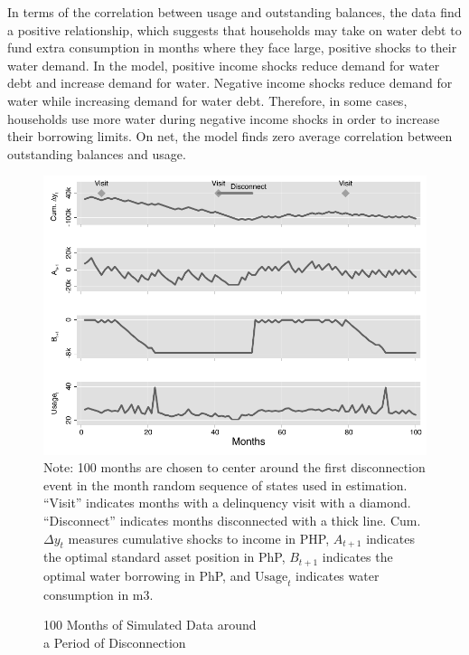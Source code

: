 \documentclass[12pt]{article}
\begin{document}
In terms of the correlation between usage and outstanding balances, the data find a positive relationship, which suggests that households may take on water debt to fund extra consumption in months where they face large, positive shocks to their water demand.  In the model, positive income shocks reduce demand for water debt and increase demand for water. Negative income shocks reduce demand for water while increasing demand for water debt.  Therefore, in some cases, households use more water during negative income shocks in order to increase their borrowing limits.  On net, the model finds zero average correlation between outstanding balances and usage.    

\begin{figure}[H]
\centering
\caption{100 Months of Simulated Data around \\ a Period of Disconnection}\label{figure:deaton}
\includegraphics[scale=1.1]{tables/new_deaton_graph.pdf} \\
{\scriptsize  Note: 100 months are chosen to center around the first disconnection event in the month random sequence of states used in estimation.  ``Visit'' indicates months with a delinquency visit with a diamond.  ``Disconnect'' indicates months disconnected with a thick line.  Cum. $\Delta y_t$ measures cumulative shocks to income in PHP, $A_{t+1}$ indicates the optimal standard asset position in PhP, $B_{t+1}$ indicates the optimal water borrowing in PhP, and $\text{Usage}_t$ indicates water consumption in m3.}
\end{figure}
\end{document}
